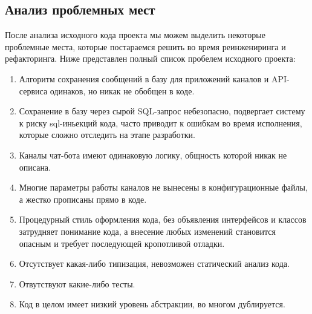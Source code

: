     \subsection{Анализ проблемных мест}
    После анализа исходного кода проекта мы можем выделить некоторые проблемные места, которые постараемся решить во время
    реинжениринга и рефакторинга. Ниже представлен полный список пробелем исходного проекта:
    \begin{enumerate}
        \item Алгоритм сохранения сообщений в базу для приложений каналов и API-сервиса одинаков, но никак не обобщен в коде.
        \item Сохранение в базу через сырой SQL-запрос небезопасно, подвергает систему к риску sql-иньекций кода, часто приводит
        к ошибкам во время исполнения, которые сложно отследить на этапе разработки.
        \item Каналы чат-бота имеют одинаковую логику, общность которой никак не описана. 
        \item Многие параметры работы каналов не вынесены в конфигурационные файлы, а жестко прописаны прямо в коде.
        \item Процедурный стиль оформления кода, без объявления интерфейсов и классов затрудняет понимание кода,
        а внесение любых изменений становится опасным и требует последующей кропотливой отладки.
        \item Отсутствует какая-либо типизация, невозможен статический анализ кода.
        \item Отвутствуют какие-либо тесты.
        \item Код в целом имеет низкий уровень абстракции, во многом дублируется.
    \end{enumerate}

